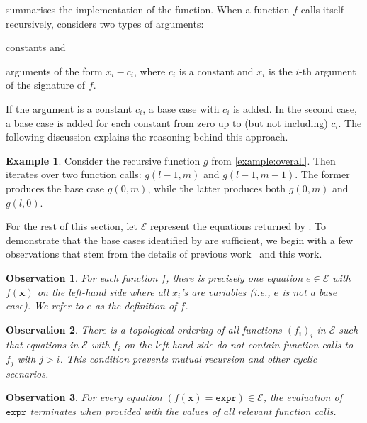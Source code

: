 \documentclass[letterpaper]{article} %
\newtheorem{fact}{Observation}
\theoremstyle{remark}
\theoremstyle{definition}
\newtheorem{example}{Example}
\newcommand{\expr}{\mathtt{expr}}
\begin{document}
 summarises the implementation of the \FindBaseCases
function. When a function $f$ calls itself recursively, \FindBaseCases considers
two types of arguments:
\begin{enumerate*}[label=(\roman*)]
  \item constants and
  \item arguments of the form $x_{i} - c_{i}$, where $c_{i}$ is a constant and
  $x_{i}$ is the $i$-th argument of the signature of $f$.
\end{enumerate*}
If the argument is a constant $c_{i}$, a base case with $c_{i}$ is added. In the
second case, a base case is added for each constant from zero up to (but not
including) $c_{i}$. The following discussion explains the reasoning behind this
approach.

\begin{example}
  Consider the recursive function $g$ from \cref{example:overall}. Then
  \FindBaseCases iterates over two function calls: $g(l-1, m)$ and
  $g(l-1, m-1)$. The former produces the base case $g(0, m)$, while the latter
  produces both $g(0, m)$ and $g(l, 0)$.
\end{example}

For the rest of this section, let $\mathcal{E}$ represent the equations returned
by \CompileWithBaseCases. To demonstrate that the base cases identified by
\FindBaseCases are sufficient, we begin with a few observations that stem from
the details of previous
work~\cite{DBLP:conf/ijcai/BroeckTMDR11,DBLP:conf/kr/DilkasB23} and this work.

\begin{fact}\label{assumption1}
  For each function $f$, there is precisely one equation $e \in \mathcal{E}$
  with $f(\mathbf{x})$ on the left-hand side where all $x_{i}$'s are variables
  (i.e., $e$ is not a base case). We refer to $e$ as the \emph{definition} of
  $f$.
\end{fact}

\begin{fact}\label{assumption2}
  There is a \emph{topological ordering} of all functions ${(f_{i})}_{i}$ in
  $\mathcal{E}$ such that equations in $\mathcal{E}$ with $f_{i}$ on the
  left-hand side do not contain function calls to $f_{j}$ with $j > i$. This
  condition prevents mutual recursion and other cyclic scenarios.
\end{fact}

\begin{fact}\label{assumption3}
  For every equation $(f(\mathbf{x}) = \expr) \in \mathcal{E}$, the evaluation
  of $\expr$ terminates when provided with the values of all relevant function
  calls.
\end{fact}
\end{document}
